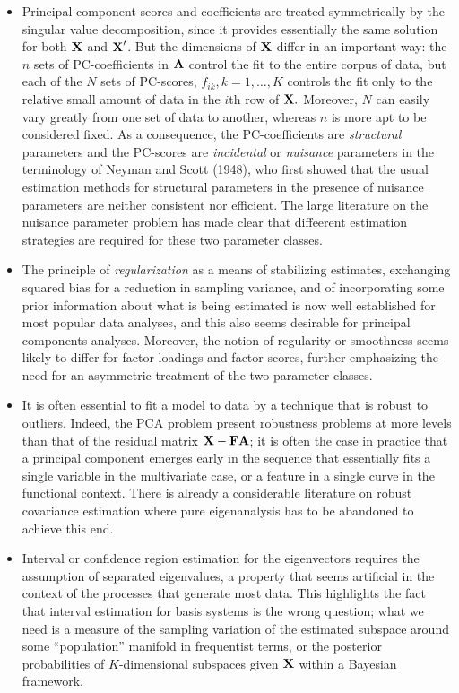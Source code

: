 \documentclass[12pt]{article}
\begin{document}
\begin{itemize}
  \item  Principal component scores and coefficients are treated symmetrically by the singular value decomposition, since it provides essentially the same solution for both $\mbox{\bf X}$ and $\mbox{\bf X}'$.  But the dimensions of $\mbox{\bf X}$ differ in an important way:  the $n$ sets of PC-coefficients in $\mbox{\bf A}$ control the fit to the entire corpus of data,  but each of the $N$ sets of PC-scores, $f_{ik},k=1,\ldots,K$ controls the fit only to the relative small amount of data in the $i$th row of $\mbox{\bf X}.$  Moreover, $N$ can easily vary greatly from one set of data to another, whereas $n$ is more apt to be considered fixed.  As a consequence, the PC-coefficients are \emph{structural} parameters and the PC-scores are \emph{incidental} or \emph{nuisance} parameters in the terminology of Neyman and Scott (1948), who first showed that the usual estimation methods for structural parameters in the presence of nuisance parameters are neither consistent nor efficient.  The large literature on the nuisance parameter problem has made clear that diffeerent estimation strategies are required for these two parameter classes.
  \item The principle of \emph{regularization} as a means of stabilizing estimates, exchanging squared bias for a reduction in sampling variance, and of incorporating some prior information about what is being estimated is now well established for most popular data analyses, and this also seems desirable for principal components analyses. Moreover, the notion of regularity or smoothness seems likely to differ for factor loadings and factor scores, further emphasizing the need for an asymmetric treatment of the two parameter classes.
  \item It is often essential to fit a model to data by a technique that is robust to outliers.  Indeed, the PCA problem present robustness problems at more levels than that of the residual matrix $\mbox{\bf X} - \mbox{\bf F} \mbox{\bf A}$; it is often the case in practice that a principal component emerges early in the sequence that essentially fits a single variable in the multivariate case, or a feature in a single curve in the functional context.  There is already a considerable literature on robust covariance estimation where pure eigenanalysis has to be abandoned to achieve this end.
  \item Interval or confidence region estimation for the eigenvectors requires the assumption of separated eigenvalues, a property that seems artificial in the context of the processes that generate most data.  This highlights the fact that interval estimation for basis systems is the wrong question; what we need is a measure of the sampling variation of the estimated subspace around some ``population'' manifold in frequentist terms, or the posterior probabilities of $K$-dimensional subspaces given $\mbox{\bf X}$ within a Bayesian framework.
\end{itemize}
\end{document}
